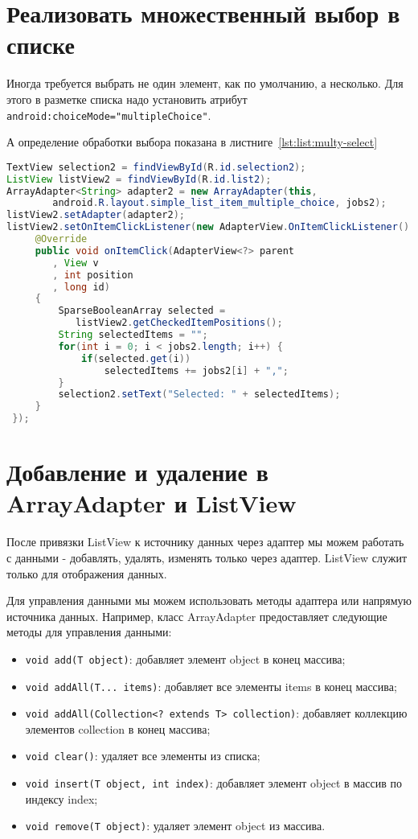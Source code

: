 \section{Реализовать множественный выбор в списке}
Иногда требуется выбрать не один элемент, как по умолчанию, а несколько.
Для этого в разметке списка надо установить атрибут
\texttt{android:choiceMode="multipleChoice"}.\par
А определение обработки выбора показана в листниге~\ref{lst:list:multy-select}

\begin{lstlisting}[language=Java
	, label=lst:list:select
	]
TextView selection2 = findViewById(R.id.selection2);
ListView listView2 = findViewById(R.id.list2);
ArrayAdapter<String> adapter2 = new ArrayAdapter(this,
		android.R.layout.simple_list_item_multiple_choice, jobs2);
listView2.setAdapter(adapter2);
listView2.setOnItemClickListener(new AdapterView.OnItemClickListener() {
	 @Override
	 public void onItemClick(AdapterView<?> parent
		, View v
		, int position
		, long id)
	 {
		 SparseBooleanArray selected = 
			listView2.getCheckedItemPositions();
		 String selectedItems = "";
		 for(int i = 0; i < jobs2.length; i++) {
			 if(selected.get(i))
				 selectedItems += jobs2[i] + ",";
		 }
		 selection2.setText("Selected: " + selectedItems);
	 }
 });
\end{lstlisting}

\section{Добавление и удаление в ArrayAdapter и ListView}
После привязки ListView к источнику данных через адаптер мы можем
работать с данными - добавлять, удалять, изменять только через адаптер.
ListView служит только для отображения данных.\par
Для управления данными мы можем использовать методы адаптера или
напрямую источника данных. Например, класс ArrayAdapter предоставляет
следующие методы для управления данными:

\begin{itemize}
	\item \texttt{void add(T object)}: добавляет элемент object
		в конец массива;
	\item \texttt{void addAll(T... items)}: добавляет все элементы items
		в конец массива;
	\item \texttt{void addAll(Collection<? extends T> collection)}:
		добавляет коллекцию элементов collection в конец массива;
	\item \texttt{void clear()}: удаляет все элементы из списка;
	\item \texttt{void insert(T object, int index)}: добавляет элемент
		object в массив по индексу index;
	\item \texttt{void remove(T object)}: удаляет элемент object из массива.
\end{itemize}

